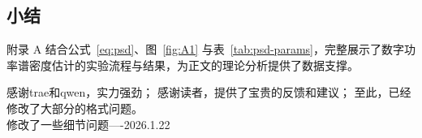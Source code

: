 \documentclass[UTF8,AutoFakeBold=1,AutoFakeSlant,zihao=-4]{SCAU}
\begin{document}
\subsection{小结}
附录 A 结合公式~\eqref{eq:psd}、图~\ref{fig:A1} 与表~\ref{tab:psd-params}，完整展示了数字功率谱密度估计的实验流程与结果，为正文的理论分析提供了数据支撑。


\acknowledgement

感谢trae和qwen，实力强劲；
感谢读者，提供了宝贵的反馈和建议；
至此，已经修改了大部分的格式问题。\\
修改了一些细节问题----2026.1.22
\end{document}
